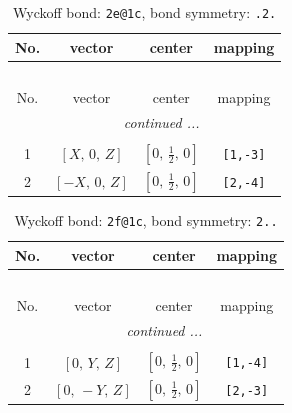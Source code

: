 \documentclass[fleqn,8pt]{jsarticle}
\begin{document}
\renewcommand{\arraystretch}{1.2}
\begin{longtable}{cccc}
\caption{Wyckoff bond: {\tt 2e@1c}, bond symmetry: {\tt .2.}}
 \\
 \hline \hline
No. & vector & center & mapping \\ \hline \endfirsthead

\multicolumn{3}{l}{\tablename\ \thetable{}} \\
 \hline \hline
No. & vector & center & mapping \\ \hline \endhead

 \hline \hline
\multicolumn{3}{r}{\footnotesize\it continued ...} \\ \endfoot

 \hline \hline
\multicolumn{3}{r}{} \\ \endlastfoot

1 & $\left[ X,\, 0,\, Z \right]$ & $\left[ 0,\, \frac{1}{2},\, 0 \right]$ & {\tt [1,-3]} \\ \hline
2 & $\left[ - X,\, 0,\, Z \right]$ & $\left[ 0,\, \frac{1}{2},\, 0 \right]$ & {\tt [2,-4]} \\
\end{longtable}
\renewcommand{\arraystretch}{1.2}
\begin{longtable}{cccc}
\caption{Wyckoff bond: {\tt 2f@1c}, bond symmetry: {\tt 2..}}
 \\
 \hline \hline
No. & vector & center & mapping \\ \hline \endfirsthead

\multicolumn{3}{l}{\tablename\ \thetable{}} \\
 \hline \hline
No. & vector & center & mapping \\ \hline \endhead

 \hline \hline
\multicolumn{3}{r}{\footnotesize\it continued ...} \\ \endfoot

 \hline \hline
\multicolumn{3}{r}{} \\ \endlastfoot

1 & $\left[ 0,\, Y,\, Z \right]$ & $\left[ 0,\, \frac{1}{2},\, 0 \right]$ & {\tt [1,-4]} \\ \hline
2 & $\left[ 0,\, - Y,\, Z \right]$ & $\left[ 0,\, \frac{1}{2},\, 0 \right]$ & {\tt [2,-3]} \\
\end{longtable}
\renewcommand{\arraystretch}{1.2}
\end{document}
